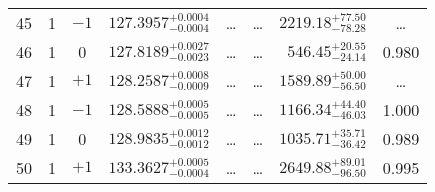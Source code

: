 \begin{table*}[!]
\begin{tabular}{llcrrlrc}
45 & 1 & $-1$ & $    127.3957_{-      0.0004}^{+      0.0004}$ & \multicolumn{1}{c}{\dots} & \multicolumn{1}{c}{\dots} & $     2219.18_{-       78.28}^{+       77.50}$ & \dots \\[1pt]
46 & 1 & 0 & $    127.8189_{-      0.0023}^{+      0.0027}$ & \multicolumn{1}{c}{\dots} & \multicolumn{1}{c}{\dots} & $      546.45_{-       24.14}^{+       20.55}$ & 0.980 \\[1pt]
47 & 1 & $+1$ & $    128.2587_{-      0.0009}^{+      0.0008}$ & \multicolumn{1}{c}{\dots} & \multicolumn{1}{c}{\dots} & $     1589.89_{-       56.50}^{+       50.00}$ & \dots \\[1pt]
48 & 1 & $-1$ & $    128.5888_{-      0.0005}^{+      0.0005}$ & \multicolumn{1}{c}{\dots} & \multicolumn{1}{c}{\dots} & $     1166.34_{-       46.03}^{+       44.40}$ & 1.000 \\[1pt]
49 & 1 & 0 & $    128.9835_{-      0.0012}^{+      0.0012}$ & \multicolumn{1}{c}{\dots} & \multicolumn{1}{c}{\dots} & $     1035.71_{-       36.42}^{+       35.71}$ & 0.989\\[1pt]

50 & 1 & $+1$ & $    133.3627_{-      0.0004}^{+      0.0005}$ & \multicolumn{1}{c}{\dots} & \multicolumn{1}{c}{\dots} & $     2649.88_{-       96.50}^{+       89.01}$ & 0.995\\[1pt]
 \hline
\end{tabular}
\end{table*}


